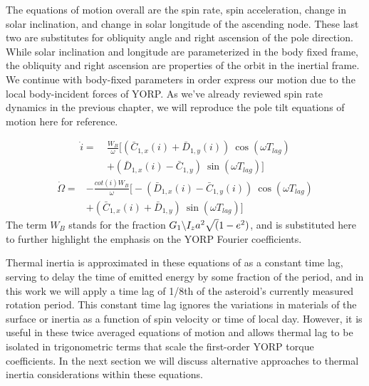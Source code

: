 The equations of motion overall are the spin rate, spin acceleration, change in solar inclination, and change in solar longitude of the ascending node. These last two are substitutes for obliquity angle and right ascension of the pole direction. While solar inclination and longitude are parameterized in the body fixed frame, the obliquity and right ascension are properties of the orbit in the inertial frame. We continue with body-fixed parameters in order express our motion due to the local body-incident forces of YORP. As we've already reviewed spin rate dynamics in the previous chapter, we will reproduce the pole tilt equations of motion here for reference.

\begin{equation}
    \begin{split}
    \dot{i} = \:&\frac{\mathit{W}_B}{\omega}\Big[(\bar{C}_{1,x}(i)+\bar{D}_{1,y}(i))\: \cos(\omega T_{lag}) \\
    & + (\bar{D}_{1,x}(i)-\bar{C}_{1,y})\: \sin(\omega T_{lag})\Big]
    \end{split}
\end{equation}
\begin{equation}
    \begin{split}
    \dot{\Omega} = &-\frac{cot(i)\mathit{W}_B}{\omega}\Big[- (\bar{D}_{1,x}(i)-\bar{C}_{1,y}(i)) \:\cos(\omega T_{lag}) \\
    & + (\bar{C}_{1,x}(i)+\bar{D}_{1,y}) \:\sin(\omega T_{lag})\Big]
    \end{split}
\end{equation}
The term $W_B$ stands for the fraction $G_1 \symbol{92} I_z a^2 \sqrt(1-e^2)$, and is substituted here to further highlight the emphasis on the YORP Fourier coefficients. 

Thermal inertia is approximated in these equations of as a constant time lag, serving to delay the time of emitted energy by some fraction of the period, and in this work we will apply a time lag of 1/8th of the asteroid's currently measured rotation period. This constant time lag ignores the variations in materials of the surface or inertia as a function of spin velocity or time of local day. However, it is useful in these twice averaged equations of motion and allows thermal lag to be isolated in trigonometric terms that scale the first-order YORP torque coefficients. In the next section we will discuss alternative approaches to thermal inertia considerations within these equations. 

